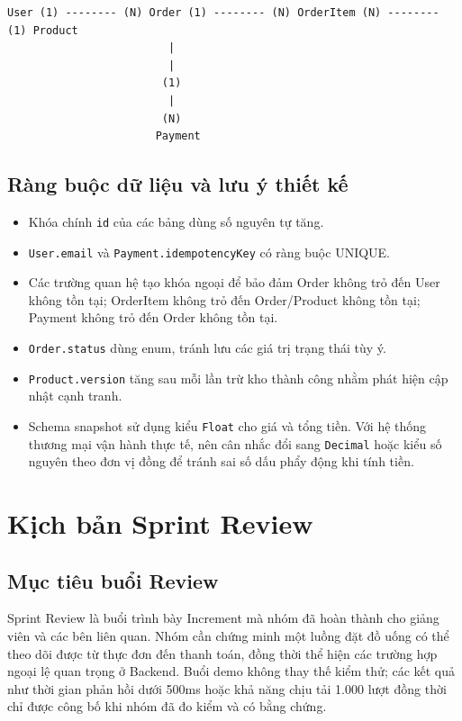 \begin{verbatim}
User (1) -------- (N) Order (1) -------- (N) OrderItem (N) -------- (1) Product
                         |
                         |
                        (1)
                         |
                        (N)
                       Payment
\end{verbatim}

\subsection{Ràng buộc dữ liệu và lưu ý thiết kế}

\begin{itemize}
    \item Khóa chính \texttt{id} của các bảng dùng số nguyên tự tăng.
    \item \texttt{User.email} và \texttt{Payment.idempotencyKey} có ràng buộc UNIQUE.
    \item Các trường quan hệ tạo khóa ngoại để bảo đảm Order không trỏ đến User không tồn tại; OrderItem không trỏ đến Order/Product không tồn tại; Payment không trỏ đến Order không tồn tại.
    \item \texttt{Order.status} dùng enum, tránh lưu các giá trị trạng thái tùy ý.
    \item \texttt{Product.version} tăng sau mỗi lần trừ kho thành công nhằm phát hiện cập nhật cạnh tranh.
    \item Schema snapshot sử dụng kiểu \texttt{Float} cho giá và tổng tiền. Với hệ thống thương mại vận hành thực tế, nên cân nhắc đổi sang \texttt{Decimal} hoặc kiểu số nguyên theo đơn vị đồng để tránh sai số dấu phẩy động khi tính tiền.
\end{itemize}

\section{Kịch bản Sprint Review}
\label{sec:sprint-review}

\subsection{Mục tiêu buổi Review}

Sprint Review là buổi trình bày Increment mà nhóm đã hoàn thành cho giảng viên và các bên liên quan. Nhóm cần chứng minh một luồng đặt đồ uống có thể theo dõi được từ thực đơn đến thanh toán, đồng thời thể hiện các trường hợp ngoại lệ quan trọng ở Backend. Buổi demo không thay thế kiểm thử; các kết quả như thời gian phản hồi dưới 500ms hoặc khả năng chịu tải 1.000 lượt đồng thời chỉ được công bố khi nhóm đã đo kiểm và có bằng chứng.

